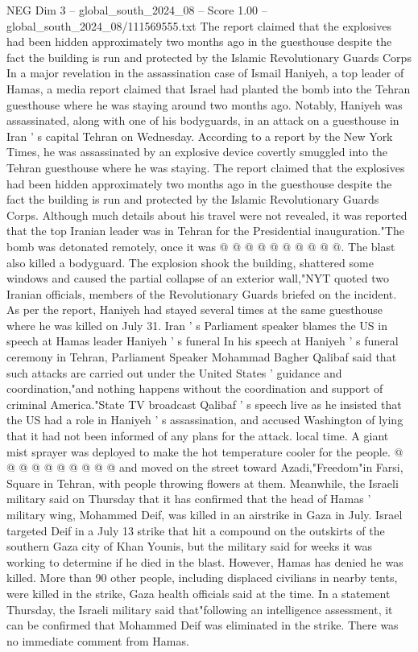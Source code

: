 \begin{textsample}{NEG Dim 3 – global\_south\_2024\_08 – Score 1.00 – global\_south\_2024\_08/111569555.txt}  \label{ex:f3_neg_123}
The report claimed that the explosives had been hidden approximately two months ago in the guesthouse despite the fact the building is run and protected by the Islamic Revolutionary Guards Corps In a major revelation in the assassination case of Ismail Haniyeh, a top leader of Hamas, a media report claimed that Israel had planted the bomb into the Tehran guesthouse where he was staying around two months ago.
Notably, Haniyeh was assassinated, along with one of his bodyguards, in an attack on a guesthouse in Iran ' s capital Tehran on Wednesday.
According to a report by the New York Times, he was assassinated by an explosive device covertly smuggled into the Tehran guesthouse where he was staying.
The report claimed that the explosives had been hidden approximately two months ago in the guesthouse despite the fact the building is run and protected by the Islamic Revolutionary Guards Corps.
Although much details about his travel were not revealed, it was reported that the top Iranian leader was in Tehran for the Presidential inauguration."The bomb was detonated remotely, once it was @ @ @ @ @ @ @ @ @ @.
The blast also killed a bodyguard.
The explosion shook the building, shattered some windows and caused the partial collapse of an exterior wall,"NYT quoted two Iranian officials, members of the Revolutionary Guards briefed on the incident.
As per the report, Haniyeh had stayed several times at the same guesthouse where he was killed on July 31.
Iran ' s Parliament speaker blames the US in speech at Hamas leader Haniyeh ' s funeral In his speech at Haniyeh ' s funeral ceremony in Tehran, Parliament Speaker Mohammad Bagher Qalibaf said that such attacks are carried out under the United States ' guidance and coordination,"and nothing happens without the coordination and support of criminal America."State TV broadcast Qalibaf ' s speech live as he insisted that the US had a role in Haniyeh ' s assassination, and accused Washington of lying that it had not been informed of any plans for the attack. local time.
A giant mist sprayer was deployed to make the hot temperature cooler for the people. @ @ @ @ @ @ @ @ @ @ and moved on the street toward Azadi,"Freedom"in Farsi, Square in Tehran, with people throwing flowers at them.
Meanwhile, the Israeli military said on Thursday that it has confirmed that the head of Hamas ' military wing, Mohammed Deif, was killed in an airstrike in Gaza in July.
Israel targeted Deif in a July 13 strike that hit a compound on the outskirts of the southern Gaza city of Khan Younis, but the military said for weeks it was working to determine if he died in the blast.
However, Hamas has denied he was killed.
More than 90 other people, including displaced civilians in nearby tents, were killed in the strike, Gaza health officials said at the time.
In a statement Thursday, the Israeli military said that"following an intelligence assessment, it can be confirmed that Mohammed Deif was eliminated in the strike.
There was no immediate comment from Hamas.

\end{textsample}
